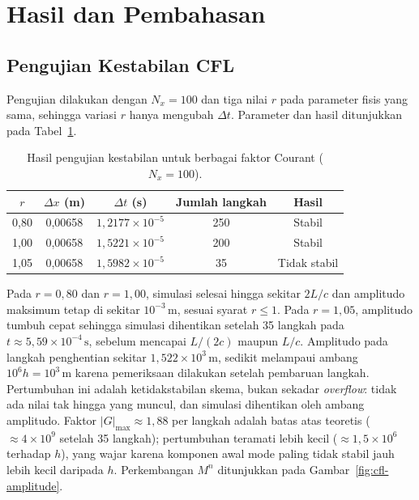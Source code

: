 \documentclass[aps,prl,twocolumn,superscriptaddress]{revtex4-2}
\begin{document}
\section{Hasil dan Pembahasan}
\label{sec:hasil-pembahasan}

\subsection{Pengujian Kestabilan CFL}

Pengujian dilakukan dengan $N_x=100$ dan tiga nilai $r$ pada parameter fisis yang sama, sehingga variasi $r$ hanya mengubah $\Delta t$. 
Parameter dan hasil ditunjukkan pada Tabel~\ref{tab:cfl-results}.

\begin{table}[htbp]
    \centering
    \caption{Hasil pengujian kestabilan untuk berbagai faktor Courant ($N_x=100$).}
    \label{tab:cfl-results}
    \begin{tabular}{ccccc}
        \hline
        $r$ & $\Delta x$ (m) & $\Delta t$ (s) &
        Jumlah langkah & Hasil \\
        \hline
        0{,}80 & 0{,}00658 &
        $1{,}2177\times10^{-5}$ & 250 & Stabil \\

        1{,}00 & 0{,}00658 &
        $1{,}5221\times10^{-5}$ & 200 & Stabil \\

        1{,}05 & 0{,}00658 &
        $1{,}5982\times10^{-5}$ & 35 &
        Tidak stabil \\
        \hline
    \end{tabular}
\end{table}

Pada $r=0{,}80$ dan $r=1{,}00$, simulasi selesai hingga sekitar $2L/c$ dan amplitudo maksimum tetap di sekitar $10^{-3}\,\mathrm{m}$, sesuai syarat $r\leq1$. 
Pada $r=1{,}05$, amplitudo tumbuh cepat sehingga simulasi dihentikan setelah 35 langkah pada $t\approx5{,}59\times10^{-4}\,\mathrm{s}$, sebelum mencapai $L/(2c)$ maupun $L/c$. 
Amplitudo pada langkah penghentian sekitar $1{,}522\times10^3\,\mathrm{m}$, sedikit melampaui ambang $10^6h=10^3\,\mathrm{m}$ karena pemeriksaan dilakukan setelah pembaruan langkah. 
Pertumbuhan ini adalah ketidakstabilan skema, bukan sekadar \textit{overflow}: tidak ada nilai tak hingga yang muncul, dan simulasi dihentikan oleh ambang amplitudo. 
Faktor $|G|_{\max}\approx1{,}88$ per langkah adalah batas atas teoretis ($\approx4\times10^9$ setelah 35 langkah); pertumbuhan teramati lebih kecil ($\approx1{,}5\times10^6$ terhadap $h$), yang wajar karena komponen awal mode paling tidak stabil jauh lebih kecil daripada $h$. 
Perkembangan $M^n$ ditunjukkan pada Gambar~\ref{fig:cfl-amplitude}.
\end{document}
